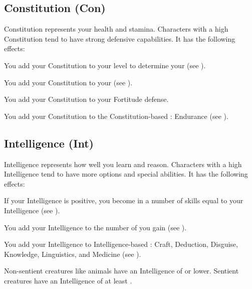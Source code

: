     \subsection{Constitution (Con)}\label{Constitution}
        {
            Constitution represents your health and stamina.
            Characters with a high Constitution tend to have strong defensive capabilities.
            It has the following effects:
            \begin{raggeditemize}
                \item You add your Constitution to your level to determine your  (see ).
                \item You add your Constitution to your  (see ).
                \item You add your Constitution to your Fortitude defense.
                \item You add your Constitution to the Constitution-based : Endurance (see ).
            \end{raggeditemize}
        }

    \subsection{Intelligence (Int)}\label{Intelligence}
        {
            Intelligence represents how well you learn and reason.
            Characters with a high Intelligence tend to have more options and special abilities.
            It has the following effects:

            \begin{raggeditemize}
                \item If your Intelligence is positive, you become  in a number of skills equal to your Intelligence (see ).
                \item You add your Intelligence to the number of  you gain (see ).
                \item You add your Intelligence to Intelligence-based : Craft, Deduction, Disguise, Knowledge, Linguistics, and Medicine (see ).
            \end{raggeditemize}

            \par Non-sentient creatures like animals have an Intelligence of  or lower.
            Sentient creatures have an Intelligence of at least .
        }

